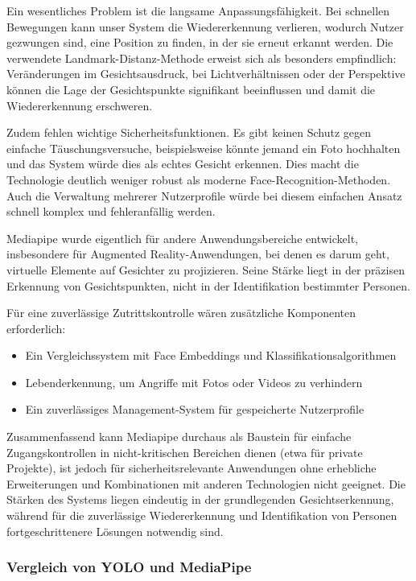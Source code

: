 Ein wesentliches Problem ist die langsame Anpassungsfähigkeit. Bei schnellen Bewegungen kann unser System die Wiedererkennung verlieren, wodurch Nutzer gezwungen sind, eine Position zu finden, in der sie erneut erkannt werden. 
Die verwendete Landmark-Distanz-Methode erweist sich als besonders empfindlich: Veränderungen im Gesichtsausdruck, bei Lichtverhältnissen oder der Perspektive können die Lage der Gesichtspunkte signifikant beeinflussen und damit die Wiedererkennung erschweren.

Zudem fehlen wichtige Sicherheitsfunktionen. Es gibt keinen Schutz gegen einfache Täuschungsversuche, beispielsweise könnte jemand ein Foto hochhalten und das System würde dies als echtes Gesicht erkennen. 
Dies macht die Technologie deutlich weniger robust als moderne Face-Recognition-Methoden. Auch die Verwaltung mehrerer Nutzerprofile würde bei diesem einfachen Ansatz schnell komplex und fehleranfällig werden.

Mediapipe wurde eigentlich für andere Anwendungsbereiche entwickelt, insbesondere für Augmented Reality-Anwendungen, bei denen es darum geht, virtuelle Elemente auf Gesichter zu projizieren. 
Seine Stärke liegt in der präzisen Erkennung von Gesichtspunkten, nicht in der Identifikation bestimmter Personen.

Für eine zuverlässige Zutrittskontrolle wären zusätzliche Komponenten erforderlich:
\begin{itemize}
    \item Ein Vergleichssystem mit Face Embeddings und Klassifikationsalgorithmen
    \item Lebenderkennung, um Angriffe mit Fotos oder Videos zu verhindern
    \item Ein zuverlässiges Management-System für gespeicherte Nutzerprofile
\end{itemize}

Zusammenfassend kann Mediapipe durchaus als Baustein für einfache Zugangskontrollen in nicht-kritischen Bereichen dienen (etwa für private Projekte), ist jedoch für sicherheitsrelevante Anwendungen ohne erhebliche Erweiterungen und Kombinationen mit anderen Technologien nicht geeignet. 
Die Stärken des Systems liegen eindeutig in der grundlegenden Gesichtserkennung, während für die zuverlässige Wiedererkennung und Identifikation von Personen fortgeschrittenere Lösungen notwendig sind.

\subsubsection{Vergleich von YOLO und MediaPipe}
